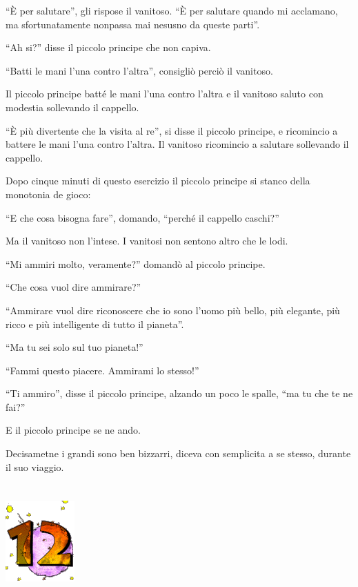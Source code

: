 \documentclass[11pt]{scrbook}
\begin{document}
``È per salutare'', gli rispose il vanitoso. ``È per salutare quando mi
acclamano, ma sfortunatamente nonpassa mai nesusno da queste parti''.

``Ah si?'' disse il piccolo principe che non capiva.

``Batti le mani l'una contro l'altra'', consigliò perciò il vanitoso.

Il piccolo principe batté le mani l'una contro l'altra e il vanitoso
saluto con modestia sollevando il cappello.

``È più divertente che la visita al re'', si disse il piccolo principe,
e ricomincio a battere le mani l'una contro l'altra. Il vanitoso
ricomincio a salutare sollevando il cappello.

Dopo cinque minuti di questo esercizio il piccolo principe si stanco
della monotonia de gioco:

``E che cosa bisogna fare'', domando, ``perché il cappello caschi?''

Ma il vanitoso non l'intese. I vanitosi non sentono altro che le lodi.

``Mi ammiri molto, veramente?'' domandò al piccolo principe.

``Che cosa vuol dire ammirare?''

``Ammirare vuol dire riconoscere che io sono l'uomo più bello, più
elegante, più ricco e più intelligente di tutto il pianeta''.

``Ma tu sei solo sul tuo pianeta!''

``Fammi questo piacere. Ammirami lo stesso!''

``Ti ammiro'', disse il piccolo principe, alzando un poco le spalle,
``ma tu che te ne fai?''

E il piccolo principe se ne ando.

Decisametne i grandi sono ben bizzarri, diceva con semplicita a se
stesso, durante il suo viaggio.

\chapter{}
\begin{center}
\includegraphics{img/chapter12}
\end{center}
\end{document}
